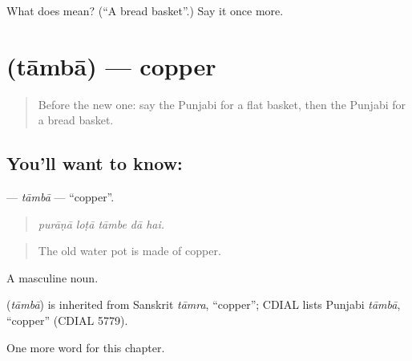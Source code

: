 \begin{tcolorbox}[breakable,colback=teal!4,colframe=teal!35!black,title={Before you move on}]
What does  mean? (\textquotedblleft{}A bread basket\textquotedblright{}.) Say it once more.
\end{tcolorbox}
\section[\texorpdfstring{\pa{ਤਾਂਬਾ} (tāmbā)}{ਤਾਂਬਾ (tāmbā)}]{ (tāmbā) — copper}

\label{lesson:PA-C251-tamba}



\begin{quote}
Before the new one: say the Punjabi for a flat basket, then the Punjabi for a bread basket.
\end{quote}

\subsection*{You'll want to know: }
\textbf{} — \emph{tāmbā} — \textquotedblleft{}copper\textquotedblright{}.

\begin{quote}
    
\end{quote}

\begin{quote}
\emph{purāṇā loṭā tāmbe dā hai.}
\end{quote}

\begin{quote}
The old water pot is made of copper.
\end{quote}

A masculine noun.

\begin{cousinweb}
\textbf{} (\emph{tāmbā}) is inherited from Sanskrit \emph{tāmra}, \textquotedblleft{}copper\textquotedblright{}; CDIAL lists Punjabi \emph{tāmbā}, \textquotedblleft{}copper\textquotedblright{} (CDIAL 5779).
\end{cousinweb}

\begin{grammarlens}[title={What you've built}]
One more word for this chapter.
\end{grammarlens}


